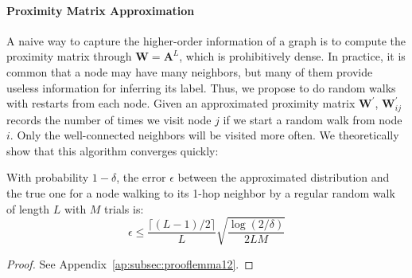\paragraph{Proximity Matrix Approximation}
A naive way to capture the higher-order information of a graph is to compute the proximity matrix through ${\boldsymbol W}={\boldsymbol A}^{L}$, which is prohibitively dense.
In practice, it is common that a node may have many neighbors, but many of them provide useless information for inferring its label.
Thus, we propose to do random walks with restarts from each node.
Given an approximated proximity matrix ${\boldsymbol W}^{\prime}$, ${\boldsymbol W}^{\prime}_{ij}$ records the number of times we visit node $j$ if we start a random walk from node $i$.
Only the well-connected neighbors will be visited more often.
We theoretically show that this algorithm converges quickly:

\begin{lemma}  \label{lem:crw1}
With probability $1 - \delta$, the error $\epsilon$ between the approximated distribution and the true one for a node walking to its 1-hop neighbor by a regular random walk of length $L$ with $M$ trials is:
\begin{equation}
    \epsilon \leq \frac{\lceil (L - 1) / 2 \rceil}{L} \sqrt{\frac{\log{(2/\delta)}}{2LM}}
\end{equation}
\end{lemma}

\begin{proof}
See Appendix~\ref{ap:subsec:prooflemma12}.
\end{proof}

